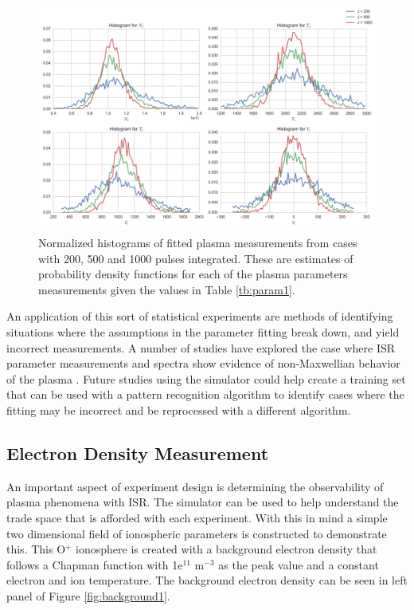 \documentclass[draft,ras]{agutex}
\begin{document}
\begin{article}
\begin{figure}[!t]
\centering
\includegraphics[width=5in]{datahist}
\caption{Normalized histograms of fitted plasma measurements from cases with 200, 500 and 1000 pulses integrated. These are estimates of probability density functions for each of the plasma parameters measurements given the values in Table \ref{tb:param1}.}
\label{fig:statshistall}
\end{figure}

An application of this sort of statistical experiments are methods of identifying situations where the assumptions in the parameter fitting break down, and yield incorrect measurements. A number of studies have explored the case where ISR parameter measurements and spectra show evidence of non-Maxwellian behavior of the plasma \citet{Akbari:2012dz,Akbari:2015fv}. Future studies using the simulator could help create a training set that can be used with a pattern recognition algorithm to identify cases where the fitting may be incorrect and be reprocessed with a different algorithm.

\subsection{Electron Density Measurement}
An important aspect of experiment design is determining the observability of plasma phenomena with ISR. The simulator can be used to help understand the trade space that is afforded with each experiment. With this in mind a simple two dimensional field of ionospheric parameters is constructed to demonstrate this. This O$^+$ ionosphere is created with a background electron density that follows a Chapman function with 1e$^{11}$ m$^{-3}$ as the peak value and a constant electron and ion temperature. The background electron density can be seen in left panel of  Figure \ref{fig:background1}.


\end{article}
\end{document}
